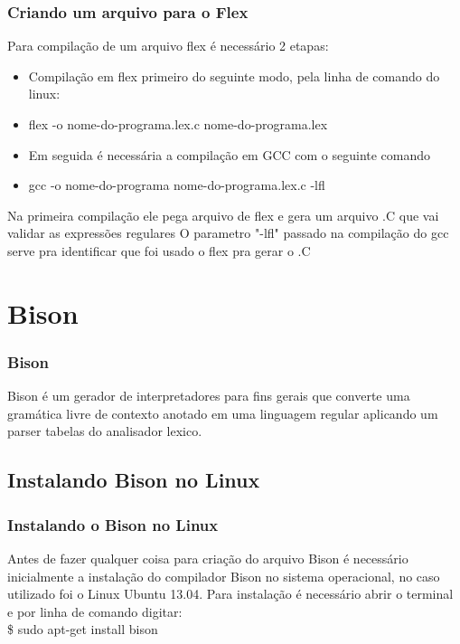 \documentclass{beamer}
\begin{document}
\begin{frame}
\frametitle{Criando um arquivo para o Flex}
	Para compilação de um arquivo flex é necessário 2 etapas:
	  \begin{itemize} 				%
	    \item<1->   Compilação em flex primeiro do seguinte modo, pela linha de comando do linux:	%
	    \item<2-> flex -o nome-do-programa.lex.c nome-do-programa.lex
	    \item<3-> Em seguida é necessária a compilação em GCC com o seguinte comando\:
	    \item<4-> gcc -o nome-do-programa nome-do-programa.lex.c -lfl
    \end{itemize}

	Na primeira compilação ele pega arquivo de flex e gera um arquivo .C que vai validar as expressões regulares 
O parametro "-lfl" passado na compilação do gcc serve pra identificar que foi usado o flex pra gerar o .C

	
\end{frame}

\section{Bison}
\begin{frame}
\frametitle{Bison}
Bison é um gerador de interpretadores para fins gerais que converte uma gramática livre de contexto anotado em uma 
linguagem regular aplicando um parser tabelas do analisador lexico.

\end{frame}
\subsection{Instalando Bison no Linux}
\begin{frame}
\frametitle{Instalando o Bison no Linux}

Antes de fazer qualquer coisa para criação do arquivo Bison é necessário inicialmente a instalação do 
compilador Bison no sistema operacional, no caso utilizado foi o Linux Ubuntu 13.04.
	Para instalação é necessário abrir o terminal e por linha de comando digitar: 
			\\ \$ sudo apt-get install bison

\end{frame}
\end{document}
